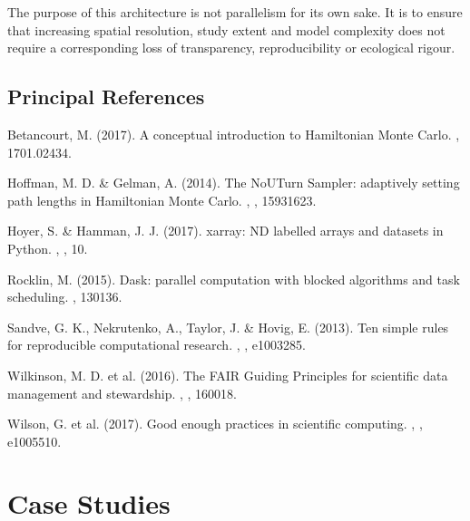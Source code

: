\documentclass[letterpaper,10pt,english]{sphinxmanual}
\begin{document}
\sphinxAtStartPar
The purpose of this architecture is not parallelism for its own sake. It is to ensure that increasing spatial resolution, study extent and model complexity does not require a corresponding loss of transparency, reproducibility or ecological rigour.


\section{Principal References}
\label{\detokenize{implementation:principal-references}}
\sphinxAtStartPar
Betancourt, M. (2017). A conceptual introduction to Hamiltonian Monte Carlo. , 1701.02434.

\sphinxAtStartPar
Hoffman, M. D. \& Gelman, A. (2014). The No\sphinxhyphen{}U\sphinxhyphen{}Turn Sampler: adaptively setting path lengths in Hamiltonian Monte Carlo. , , 1593\textendash{}1623.

\sphinxAtStartPar
Hoyer, S. \& Hamman, J. J. (2017). xarray: N\sphinxhyphen{}D labelled arrays and datasets in Python. , , 10.

\sphinxAtStartPar
Rocklin, M. (2015). Dask: parallel computation with blocked algorithms and task scheduling. , 130\textendash{}136.

\sphinxAtStartPar
Sandve, G. K., Nekrutenko, A., Taylor, J. \& Hovig, E. (2013). Ten simple rules for reproducible computational research. , , e1003285.

\sphinxAtStartPar
Wilkinson, M. D. et al. (2016). The FAIR Guiding Principles for scientific data management and stewardship. , , 160018.

\sphinxAtStartPar
Wilson, G. et al. (2017). Good enough practices in scientific computing. , , e1005510.

\sphinxstepscope


\chapter{Case Studies}
\label{\detokenize{case-studies:case-studies}}\label{\detokenize{case-studies::doc}}
\end{document}
